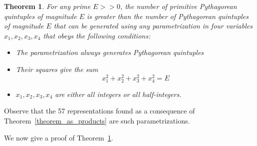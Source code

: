 \documentclass[12pt,table]{article}
\newtheorem{theorem}{Theorem}[section]
\theoremstyle{definition}
\theoremstyle{remark}
\numberwithin{equation}{section}
\begin{document}
\begin{theorem}
\label{theorem_analysis}
For any prime $E >> 0$, the number of primitive  Pythagorean 
quintuples of magnitude $E$ is greater than the number of 
Pythagorean quintuples of magnitude $E$ that can be generated using 
any parametrization in four variables $x_1, x_2, x_3, x_4$ that
obeys the following conditions:
\begin{itemize}
\item[(i)]
The parametrization always 
generates Pythagorean quintuples

\item[(ii)]
Their squares give the sum
\[
     x_1^2 + x_2^2 + x_3^2 + x_4^2 = E
\]

\item[(iii)]
$x_1, x_2, x_3, x_4$ are either all integers or
all half-integers.
\end{itemize}
\end{theorem}


Observe that the 57 representations found as a consequence of
Theorem~\ref{theorem_as_products} are such parametrizations.


We now give a 
proof of Theorem~\ref{theorem_analysis}.
\end{document}
